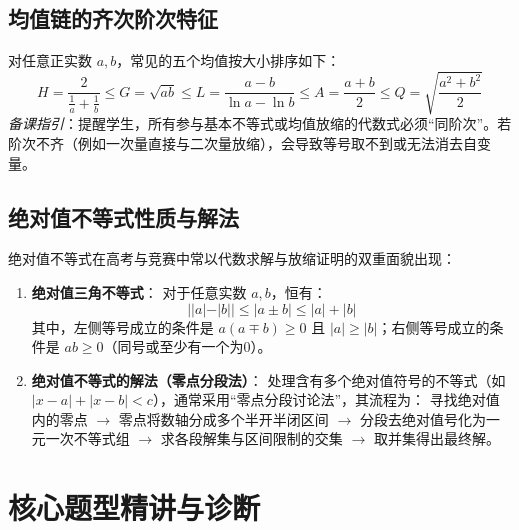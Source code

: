 \documentclass[12pt,a4paper]{ctexart}
\begin{document}
\subsection{均值链的齐次阶次特征}
对任意正实数 \(a, b\)，常见的五个均值按大小排序如下：
\[
H = \frac{2}{\frac{1}{a} + \frac{1}{b}} \leqslant G = \sqrt{ab} \leqslant L = \frac{a - b}{\ln a - \ln b} \leqslant A = \frac{a + b}{2} \leqslant Q = \sqrt{\frac{a^2 + b^2}{2}}
\]
\textit{备课指引}：提醒学生，所有参与基本不等式或均值放缩的代数式必须“同阶次”。若阶次不齐（例如一次量直接与二次量放缩），会导致等号取不到或无法消去自变量。

\subsection{绝对值不等式性质与解法}
绝对值不等式在高考与竞赛中常以代数求解与放缩证明的双重面貌出现：

\begin{enumerate}[label=\arabic*. , leftmargin=2em, itemsep=1.2em, topsep=0.2em]
  \item \textbf{绝对值三角不等式}：
  对于任意实数 \(a, b\)，恒有：
  \[
  ||a| - |b|| \leqslant |a \pm b| \leqslant |a| + |b|
  \]
  其中，左侧等号成立的条件是 \(a(a \mp b) \geqslant 0\) 且 \(|a| \geqslant |b|\)；右侧等号成立的条件是 \(ab \geqslant 0\)（同号或至少有一个为0）。
  
  \item \textbf{绝对值不等式的解法（零点分段法）}：
  处理含有多个绝对值符号的不等式（如 \(|x-a| + |x-b| < c\)），通常采用“零点分段讨论法”，其流程为：
  寻找绝对值内的零点 \(\to\) 零点将数轴分成多个半开半闭区间 \(\to\) 分段去绝对值号化为一元一次不等式组 \(\to\) 求各段解集与区间限制的交集 \(\to\) 取并集得出最终解。
\end{enumerate}

\newpage

\section{核心题型精讲与诊断}

\qOneStem
\qOneOptions
\end{document}
